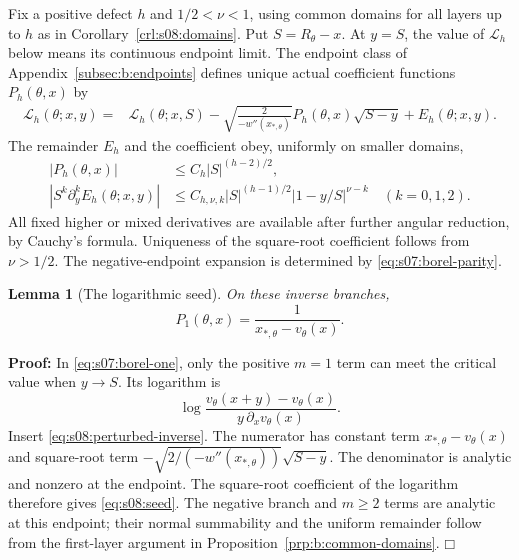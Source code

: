 \documentclass[a4paper,10pt]{article}
\numberwithin{equation}{section}
\theoremstyle{paperplain}
\newtheorem{lmm}[thm]{Lemma}
\theoremstyle{paperremark}
\theoremstyle{paperplain}
\newenvironment{prf}{\noindent \textbf{Proof: }}{\hfill $\mdlgwhtsquare$\par\addvspace{0.5\baselineskip}}
\begin{document}
Fix a positive defect $h$ and $1/2<\nu<1$, using common domains for
all layers up to $h$ as in Corollary~\ref{crl:s08:domains}.
Put $S=R_\theta-x$. At $y=S$, the value of $\mathcal L_h$ below
means its continuous endpoint limit. The endpoint class of
Appendix~\ref{subsec:b:endpoints} defines unique actual coefficient
functions $P_h(\theta,x)$ by
\begin{equation}\label{eq:s08:leading-expansion}
 \begin{aligned}
 \mathcal L_h(\theta;x,y)
 ={}&\mathcal L_h(\theta;x,S)
 -\sqrt{\frac{2}{-w''(x_{*,\theta})}}
                    P_h(\theta,x)\sqrt{S-y}
 +E_h(\theta;x,y).
 \end{aligned}
\end{equation}
The remainder $E_h$ and the coefficient obey, uniformly on smaller
domains,
\begin{equation}\label{eq:s08:leading-bounds}
 \begin{aligned}
 |P_h(\theta,x)|&\leq C_h|S|^{(h-2)/2},\\
 |S^k\partial_y^k E_h(\theta;x,y)|
 &\leq C_{h,\nu,k}|S|^{(h-1)/2}|1-y/S|^{\nu-k}
                                      \quad(k=0,1,2).
 \end{aligned}
\end{equation}
All fixed higher or mixed derivatives are available after further
angular reduction, by Cauchy's formula. Uniqueness of the
square-root coefficient follows from $\nu>1/2$.
The negative-endpoint expansion is determined by
\eqref{eq:s07:borel-parity}.

\begin{lmm}[The logarithmic seed]\label{lmm:s08:seed}
On these inverse branches,
\begin{equation}\label{eq:s08:seed}
 P_1(\theta,x)=\frac1{x_{*,\theta}-v_\theta(x)}.
\end{equation}
\end{lmm}
\begin{prf}
In \eqref{eq:s07:borel-one}, only the positive $m=1$ term can
meet the critical value when $y\to S$. Its logarithm is
\[
 \log\frac{v_\theta(x+y)-v_\theta(x)}
                  {y\,\partial_xv_\theta(x)}.
\]
Insert \eqref{eq:s08:perturbed-inverse}. The numerator has
constant term $x_{*,\theta}-v_\theta(x)$ and square-root term
$-\sqrt{2/(-w''(x_{*,\theta}))}\sqrt{S-y}$.
The denominator is analytic and nonzero at the endpoint.
The square-root coefficient of the logarithm therefore gives
\eqref{eq:s08:seed}. The negative branch and $m\geq2$ terms are
analytic at this endpoint; their normal summability and the uniform
remainder follow from the first-layer argument in
Proposition~\ref{prp:b:common-domains}.
\end{prf}
\end{document}
